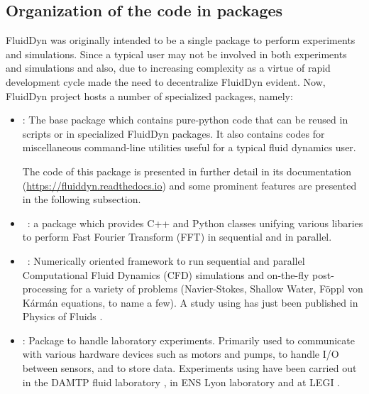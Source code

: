 \subsection{Organization of the code in packages}

FluidDyn was originally intended to be a single package to perform experiments
and simulations. Since a typical user may not be involved in both experiments
and simulations and also, due to increasing complexity as a virtue of rapid
development cycle made the need to decentralize FluidDyn evident.
Now, FluidDyn project hosts a number of specialized packages, namely:

\begin{itemize}
\item {}: The base package which contains pure-python code that can
be reused in scripts or in specialized FluidDyn packages. It also contains codes
for miscellaneous command-line utilities useful for a typical fluid dynamics user.

The code of this package is presented in further detail in its documentation
(\url{https://fluiddyn.readthedocs.io}) and some prominent features are presented
in the following subsection.

\item {}~\cite[see the companion paper][]{fluidfft}: a package which
provides C++ and Python classes unifying various libaries to perform Fast Fourier
Transform (FFT) in sequential and in parallel.

\item {}~\cite[see the companion paper][]{fluidsim}: Numerically
oriented framework to run sequential and parallel Computational Fluid Dynamics
(CFD) simulations and on-the-fly post-processing for a variety of problems
(Navier-Stokes, Shallow Water, F\"oppl von K\'arm\'an equations, to name a few).
A study using  has just been published in Physics of Fluids
\cite[]{LindborgMohanan2017}.

\item {}: Package to handle laboratory experiments. Primarily used to
communicate with various hardware devices such as motors and pumps, to handle I/O
between sensors, and to store data.
%
Experiments using  have been carried out in the DAMTP fluid
laboratory \cite[Cambridge, UK. cf.][]{LeclercqPartridgeAugierDalzielKerswell2016}, in ENS Lyon laboratory
\cite[Lyon, France][]{salort2018} and at LEGI \cite[Grenoble, France][]{ISSF2016}.


\end{itemize}
